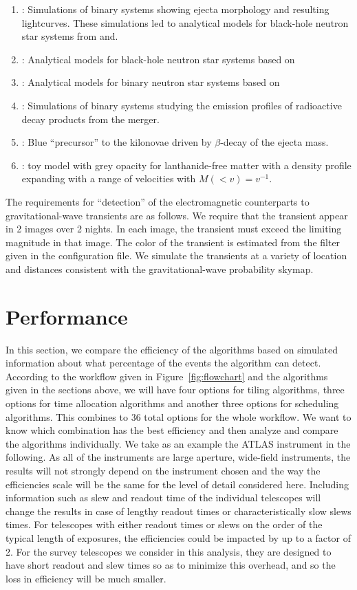 \documentclass[twocolumn]{aastex62}
\begin{document}
\begin{enumerate}
\item \cite{TaHo2014}: Simulations of binary systems showing ejecta morphology and resulting lightcurves. These simulations led to analytical models for black-hole neutron star systems from \cite{KaKy2016} and\cite{DiUj2017}.
\item \cite{KaKy2016}: Analytical models for black-hole neutron star systems based on \cite{TaHo2014}
\item \cite{DiUj2017}: Analytical models for binary neutron star systems based on \cite{TaHo2014}
\item \cite{BaKa2016}: Simulations of binary systems studying the emission profiles of radioactive decay products from the merger.
\item \cite{MeBa2015}: Blue ``precursor'' to the kilonovae driven by $\beta$-decay of the ejecta mass.
\item \cite{Me2017}: toy model with grey opacity for lanthanide-free matter with a density profile expanding with a range of velocities with $M(< v) = v^{-1}$.
\end{enumerate}

The requirements for ``detection'' of the electromagnetic counterparts to gravitational-wave transients are as follows.
We require that the transient appear in 2 images over 2 nights.
In each image, the transient must exceed the limiting magnitude in that image.
The color of the transient is estimated from the filter given in the configuration file.
We simulate the transients at a variety of location and distances consistent with the gravitational-wave probability skymap.


\section{Performance}
\label{sec:performance}
In this section, we compare the efficiency of the algorithms based on simulated information about what percentage of the events the algorithm can detect. According to the workflow given in Figure~\ref{fig:flowchart} and the algorithms given in the sections above, we will have four options for tiling algorithms, three options for time allocation algorithms and another three options for scheduling algorithms. This combines to 36 total options for the whole workflow. We want to know which combination has the best efficiency and then analyze and compare the algorithms individually.
We take as an example the ATLAS instrument in the following. 
As all of the instruments are large aperture, wide-field instruments, the results will not strongly depend on the instrument chosen and the way the efficiencies scale will be the same for the level of detail considered here.
Including information such as slew and readout time of the individual telescopes will change the results in case of lengthy readout times or characteristically slow slews times.
For telescopes with either readout times or slews on the order of the typical length of exposures, the efficiencies could be impacted by up to a factor of 2.
For the survey telescopes we consider in this analysis, they are designed to have short readout and slew times so as to minimize this overhead, and so the loss in efficiency will be much smaller.
\end{document}

